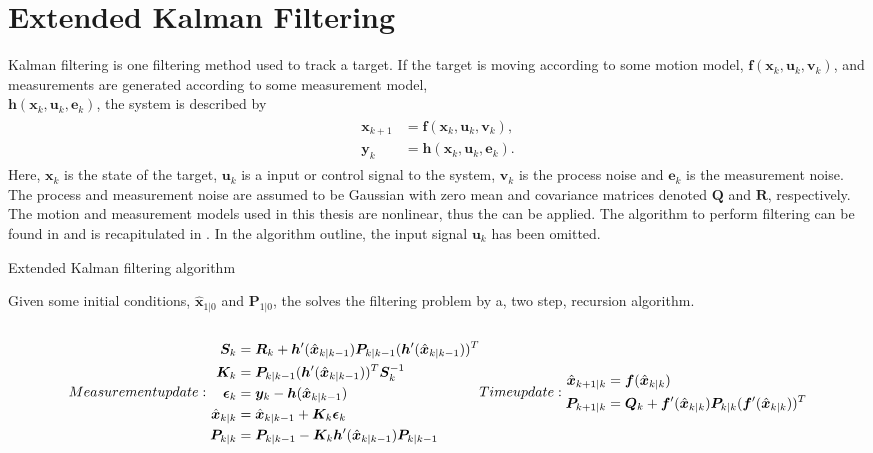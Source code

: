 \newpage

\section{Extended Kalman Filtering}
Kalman filtering \cite{Gustafsson:2012} is one filtering method used to track a target.
If the target is moving according to some motion model, $\bm{f}(\bm{x}_k,\bm{u}_k,\bm{v}_k)$, and measurements are generated according to some measurement model, \\ $\bm{h}(\bm{x}_k,\bm{u}_k,\bm{e}_k)$, the system is described by
\begin{align}
\begin{split}
	\bm{x}_{k+1} &= \bm{f}(\bm{x}_k,\bm{u}_k,\bm{v}_k), \\
	\bm{y}_k &= \bm{h}(\bm{x}_k,\bm{u}_k,\bm{e}_k).
\end{split}
\end{align}
Here, $\bm{x}_k$ is the state of the target, $\bm{u}_k$ is a input or control signal to the system, $\bm{v}_k$ is the process noise and $\bm{e}_k$ is the measurement noise.
The process and measurement noise are assumed to be Gaussian with zero mean and covariance matrices denoted $\bm{Q}$ and $\bm{R}$, respectively.
The motion and measurement models used in this thesis are nonlinear, thus the \abbrEKF can be applied.
The algorithm to perform \abbrEKF filtering can be found in \cite{Gustafsson:2012} and is recapitulated in .
In the algorithm outline, the input signal $\bm{u}_k$ has been omitted.

\begin{algorithm}
	\caption{\label{algo:ekf} Extended Kalman filtering algorithm}
	Given some initial conditions, $\hat{\bm{x}}_{1|0}$ and $\bm{P}_{1|0}$, the \abbrEKF solves the filtering problem by a, two step, recursion algorithm. \\ \\
	\begin{subequations}
	Measurement update:
	\begin{align}
		\bm{S}_k &= \bm{R}_k + \bm{h}^\prime(\hat{\bm{x}}_ {k|k-1}) \bm{P}_{k|k-1} (\bm{h}^\prime(\hat{\bm{x}}_ {k|k-1}))^T \\
		\bm{K}_k &= \bm{P}_{k|k-1} (\bm{h}^\prime(\hat{\bm{x}}_ {k|k-1}))^T \bm{S}_k^{-1} \\
		\bm{\epsilon}_k &= \bm{y}_k - \bm{h}(\hat{\bm{x}}_{k|k-1}) \\
		\hat{\bm{x}}_{k|k} &= \hat{\bm{x}}_{k|k-1} + \bm{K}_k \bm{\epsilon}_k \\
		\bm{P}_{k|k} &= \bm{P}_{k|k-1} - \bm{K}_k \bm{h}^\prime(\hat{\bm{x}}_{k|k-1}) \bm{P}_{k|k-1}
	\end{align}
	\\
	Time update:
	\begin{align}
		\hat{\bm{x}}_{k+1|k} &= \bm{f}(\hat{\bm{x}}_{k|k}) \\
		\bm{P}_{k+1|k} &= \bm{Q}_k + \bm{f}^\prime(\hat{\bm{x}}_{k|k}) \bm{P}_{k|k} (\bm{f}^\prime(\hat{\bm{x}}_{k|k}))^T
	\end{align}
	\end{subequations}
\end{algorithm}

